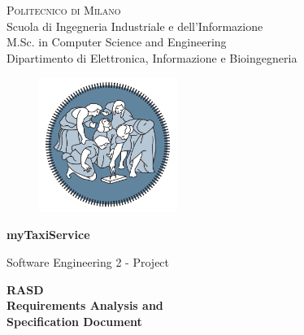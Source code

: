 \begin{titlepage}

\begin{center}
\Large{\textsc{Politecnico di Milano}}\\
\Large{Scuola di Ingegneria Industriale e dell'Informazione}\\
\large{M.Sc. in Computer Science and Engineering}\\
\large{Dipartimento di Elettronica, Informazione e Bioingegneria}
\par\end{center}

\vspace{0.3cm}


\begin{center}
\begin{figure}[h]
\centering{}\includegraphics[width=0.4\textwidth]{title-page/logo}
\end{figure}
\vspace{0.4cm}

\par\end{center}

\begin{center}
\huge{\textbf{myTaxiService}}\\
\vspace{0.2cm}

\par\end{center}

\begin{center}
\Large{Software Engineering 2 - Project}
\par\end{center}

\begin{center}
\vspace{0.9cm}
\Huge{\textbf{RASD}}\\
\Large{\textbf{Requirements Analysis and }\\
\textbf{Specification Document}}
\par\end{center}


\end{titlepage}
